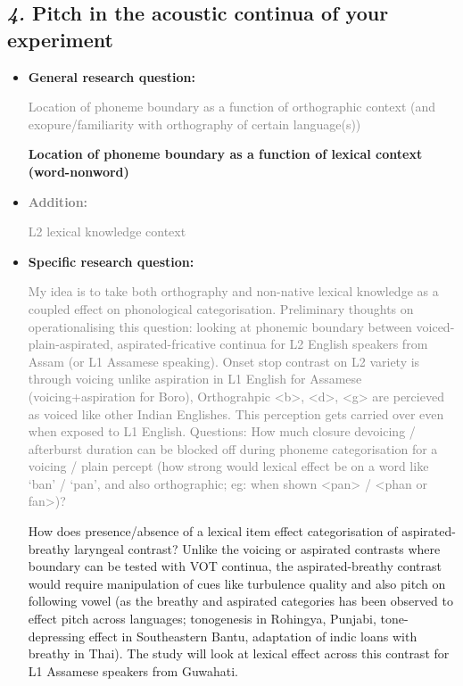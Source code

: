 \documentclass[12pt, english]{article}
\begin{document}
\subsection*{\emph{4.} Pitch in the acoustic continua of your experiment}
\vspace{10pt}

\begin{itemize}
    \item \textbf{General research question:} \par
    \textcolor{gray}{Location of phoneme boundary as a function of orthographic context (and exopure/familiarity with orthography of certain language(s))} \par
    \textbf{Location of phoneme boundary as a function of lexical context (word-nonword)}
    \item \textbf{\textcolor{gray}{Addition:}} \par
    \textcolor{gray}{L2 lexical knowledge context}
    \item \textbf{Specific research question:} \par
    \textcolor{gray}{My idea is to take both orthography and non-native lexical knowledge as a coupled effect on phonological categorisation. Preliminary thoughts on operationalising this question: looking at phonemic boundary between voiced-plain-aspirated, aspirated-fricative continua for L2 English speakers from Assam (or L1 Assamese speaking). Onset stop contrast on L2 variety is through voicing unlike aspiration in L1 English for Assamese (voicing+aspiration for Boro), Orthograhpic <b>, <d>, <g> are percieved as voiced like other Indian Englishes. This perception gets carried over even when exposed to L1 English. Questions: How much closure devoicing / afterburst duration can be blocked off during phoneme categorisation for a voicing / plain percept (how strong would lexical effect be on a word like `ban' / `pan', and also orthographic; eg: when shown <pan> / <phan or fan>)?} \par
    How does presence/absence of a lexical item effect categorisation of aspirated-breathy laryngeal contrast? Unlike the voicing or aspirated contrasts where boundary can be tested with VOT continua, the aspirated-breathy contrast would require manipulation of cues like turbulence quality and also pitch on following vowel (as the breathy and aspirated categories has been observed to effect pitch across languages; tonogenesis in Rohingya, Punjabi, tone-depressing effect in Southeastern Bantu, adaptation of indic loans with breathy in Thai). The study will look at lexical effect across this contrast for L1 Assamese speakers from Guwahati.       

\end{itemize}
\end{document}
